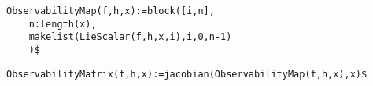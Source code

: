 \noindent
\begin{minipage}[t]{\textwidth}\color{blue}
\begin{verbatim}
ObservabilityMap(f,h,x):=block([i,n],
    n:length(x),
    makelist(LieScalar(f,h,x,i),i,0,n-1)
    )$
\end{verbatim}
\end{minipage}

\medskip

\noindent
\begin{minipage}[t]{\textwidth}\color{blue}
\begin{verbatim}
ObservabilityMatrix(f,h,x):=jacobian(ObservabilityMap(f,h,x),x)$
\end{verbatim}
\end{minipage}
